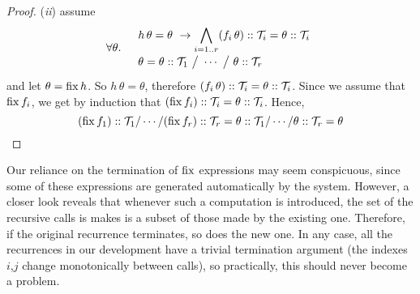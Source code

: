 \begin{proof}
({\it ii}) assume
\[\renewcommand\arraystretch{1.3}
  \forall\theta. \quad
  \begin{array}{l}
  \displaystyle
    h\,\theta = \theta ~\limplies \bigwedge_{i=1..r}(f_i\,\theta)::\T_i = \theta::\T_i \\
    \theta = \theta::\T_1 ~\big/~ \cdots ~\big/~ \theta::\T_r
  \end{array}  
\]
%
and let $\theta=\operatorname{fix} h$. So $h\,\theta=\theta$, therefore $(f_i\,\theta)::\mathcal{T}_i=\theta::\mathcal{T}_i$.
Since we assume that $\operatorname{fix} f_i$, we get by induction that $(\operatorname{fix} f_i)::\mathcal{T}_i=\theta::\mathcal{T}_i$.
Hence,
\[(\operatorname{fix} f_1)::\mathcal{T}_1 / \cdots / (\operatorname{fix} f_r)::\mathcal{T}_r = \theta::\mathcal{T}_1 / \cdots / \theta::\mathcal{T}_r = \theta\]
\end{proof}

Our reliance on the termination of $\operatorname{fix}$ expressions may seem conspicuous, since some of these
expressions are generated automatically by the system. However, a closer look reveals that whenever
such a computation is introduced, the set of the recursive calls is makes is a subset of those made by the existing one.
Therefore, if the original recurrence terminates, so does the new one. In any case, all the recurrences
in our development have a trivial termination argument (the indexes $i$,$j$ change monotonically between calls),
so practically, this should never become a problem.
